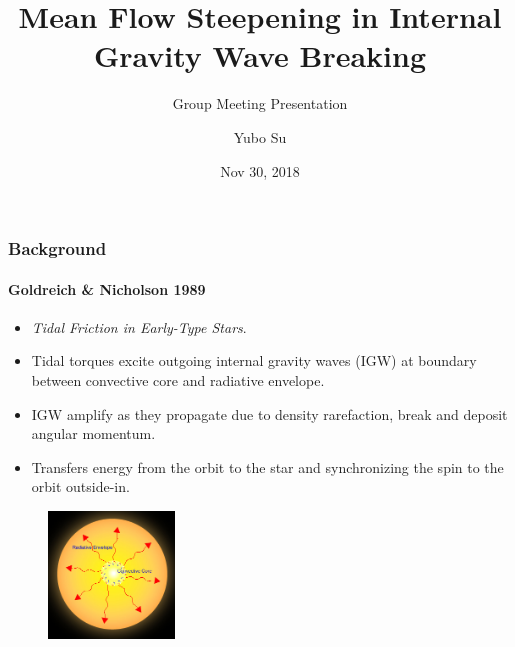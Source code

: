 \documentclass[dvipsnames, 10pt]{beamer}
\begin{document}
\title[IGWs \& Mean Flow Steepening]{
Mean Flow Steepening in Internal Gravity Wave Breaking}
\subtitle{Group Meeting Presentation}
\author{Yubo Su}
\date{Nov 30, 2018}

\maketitle

\begin{frame}
    \frametitle{Background}
    \framesubtitle{Goldreich \& Nicholson 1989}

    \begin{itemize}
        \item \emph{Tidal Friction in Early-Type Stars}.

        \item Tidal torques excite outgoing internal gravity waves (IGW) at
            boundary between convective core and radiative envelope.

        \item IGW amplify as they propagate due to density rarefaction, break
            and deposit angular momentum.

        \item Transfers energy from the orbit to the star and synchronizing the
            spin to the orbit outside-in.
    \end{itemize}
    \begin{figure}[t]
        \centering
        \includegraphics[width=0.3\textwidth]{../Su_GM_092118/conv_core.jpg}
    \end{figure}
\end{frame}
\end{document}

